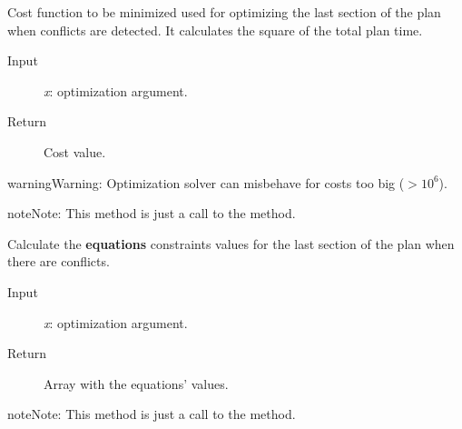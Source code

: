 \documentclass[letterpaper,10pt,english]{sphinxmanual}
\begin{document}
\begin{fulllineitems}

\begin{fulllineitems}
\label{Multi-robot motion planner:planning_sim.Robot._ls_co_criterion}
Cost function to be minimized used for optimizing
the last section of the plan when conflicts are detected.
It calculates the square of the total plan time.
\begin{description}
\item[{Input}] \leavevmode
\emph{x}: optimization argument.

\item[{Return}] \leavevmode
Cost value.

\end{description}

\begin{notice}{warning}{Warning:}
Optimization solver can misbehave for costs too big (\(> 10^{6}\)).
\end{notice}

\begin{notice}{note}{Note:}
This method is just a call to the {\hyperref[Multi-robot motion planner:planning_sim.Robot._ls_sa_criterion]{}} method.
\end{notice}

\end{fulllineitems}


\begin{fulllineitems}
\label{Multi-robot motion planner:planning_sim.Robot._ls_co_feqcons}
Calculate the \textbf{equations} constraints values for the last section of the plan when
there are conflicts.
\begin{description}
\item[{Input}] \leavevmode
\emph{x}: optimization argument.

\item[{Return}] \leavevmode
Array with the equations' values.

\end{description}

\begin{notice}{note}{Note:}
This method is just a call to the {\hyperref[Multi-robot motion planner:planning_sim.Robot._ls_co_criterion]{}} method.
\end{notice}


\end{fulllineitems}
\end{fulllineitems}
\end{document}
